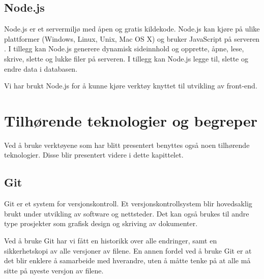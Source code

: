 
\subsection{Node.js}
Node.js er et servermiljø med åpen og gratis kildekode. Node.js kan kjøre på ulike plattformer (Windows, Linux, Unix, Mac OS X) og bruker JavaScript på serveren \cite{w3schools2019win}. I tillegg kan Node.js generere dynamisk sideinnhold og opprette, åpne, lese, skrive, slette og lukke filer på serveren. I tillegg kan Node.js legge til, slette og endre data i databasen.

Vi har brukt Node.js for å kunne kjøre verktøy knyttet til utvikling av front-end.

\section{Tilhørende teknologier og begreper}
Ved å bruke verktøyene som har blitt presentert benyttes også noen tilhørende teknologier. Disse blir presentert videre i dette kapittelet. 

\subsection{Git}
Git \cite{TechTarget} er et system for versjonskontroll. Et versjonskontrollsystem blir hovedsaklig brukt under utvikling av software og nettsteder. Det kan også brukes til andre type prosjekter som grafisk design og skriving av dokumenter.

Ved å bruke Git har vi fått en historikk over alle endringer, samt en sikkerhetskopi av alle versjoner av filene. En annen fordel ved å bruke Git er at det blir enklere å samarbeide med hverandre, uten å måtte tenke på at alle må sitte på nyeste versjon av filene.



